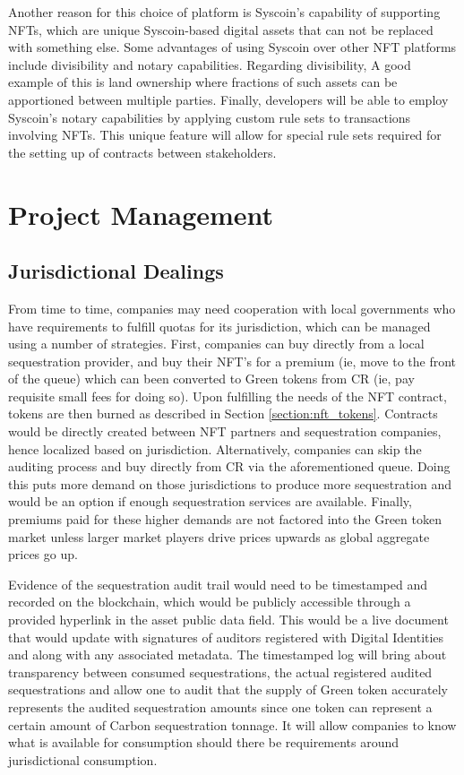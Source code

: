 \documentclass{article}
\begin{document}
Another reason for this choice of platform is Syscoin's capability of supporting NFTs, which are unique Syscoin-based digital assets that can not be replaced with something else. Some advantages of using Syscoin over other NFT platforms include divisibility and notary capabilities. Regarding divisibility, A good example of this is land ownership where fractions of such assets can be apportioned between multiple parties. Finally, developers will be able to employ Syscoin's notary capabilities by applying custom rule sets to transactions involving NFTs. This unique feature will allow for special rule sets required for the setting up of contracts between stakeholders.

\section{Project Management}

\subsection{Jurisdictional Dealings}

From time to time, companies may need cooperation with local governments who have requirements to fulfill quotas for its jurisdiction, which can be managed using a number of strategies. First, companies can buy directly from a local sequestration provider, and buy their NFT’s for a premium (ie, move to the front of the queue) which can been converted to Green tokens from CR (ie, pay requisite small fees for doing so). Upon fulfilling the needs of the NFT contract, tokens are then burned as described in Section \ref{section:nft_tokens}. Contracts would be directly created between NFT partners and sequestration companies, hence localized based on jurisdiction. Alternatively, companies can skip the auditing process and buy directly from CR via the aforementioned queue. Doing this puts more demand on those jurisdictions to produce more sequestration and would be an option if enough sequestration services are available. Finally, premiums paid for these higher demands are not factored into the Green token market unless larger market players drive prices upwards as global aggregate prices go up.

Evidence of the sequestration audit trail would need to be timestamped and recorded on the blockchain, which would be publicly accessible through a provided hyperlink in the asset public data field. This would be a live document that would update with signatures of auditors registered with Digital Identities and along with any associated metadata. The timestamped log will bring about transparency between consumed sequestrations, the actual registered audited sequestrations and allow one to audit that the supply of Green token accurately represents the audited sequestration amounts since one token can represent a certain amount of Carbon sequestration tonnage. It will allow companies to know what is available for consumption should there be requirements around jurisdictional consumption.
\end{document}
